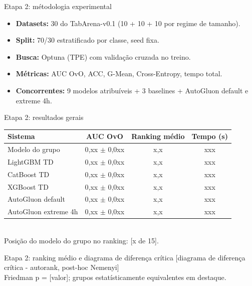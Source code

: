 \documentclass[aspectratio=169,11pt]{beamer}
\begin{document}
\begin{frame}{Etapa 2: métodologia experimental}
    \begin{itemize}
        \item \textbf{Datasets:} 30 do TabArena-v0.1 (10 + 10 + 10 por regime de tamanho).
        \item \textbf{Split:} 70/30 estratificado por classe, seed fixa.
        \item \textbf{Busca:} Optuna (TPE) com validação cruzada no treino.
        \item \textbf{Métricas:} AUC OvO, ACC, G-Mean, Cross-Entropy, tempo total.
        \item \textbf{Concorrentes:} 9 modelos atribuíveis + 3 baselines + AutoGluon default e extreme 4h.
    \end{itemize}
\end{frame}

\begin{frame}{Etapa 2: resultados gerais}
    \footnotesize
    \begin{tabular}{l c c c}
        \toprule
        \textbf{Sistema} & \textbf{AUC OvO} & \textbf{Ranking médio} & \textbf{Tempo (s)} \\
        \midrule
        Modelo do grupo      & 0,xx $\pm$ 0,0xx & x,x & xxx \\
        LightGBM TD          & 0,xx $\pm$ 0,0xx & x,x & xxx \\
        CatBoost TD          & 0,xx $\pm$ 0,0xx & x,x & xxx \\
        XGBoost TD           & 0,xx $\pm$ 0,0xx & x,x & xxx \\
        AutoGluon default    & 0,xx $\pm$ 0,0xx & x,x & xxx \\
        AutoGluon extreme 4h & 0,xx $\pm$ 0,0xx & x,x & xxx \\
        \bottomrule
    \end{tabular}
    \vspace{0.3em}
    \\
    \footnotesize Posição do modelo do grupo no ranking: [x de 15].
\end{frame}

\begin{frame}{Etapa 2: ranking médio e diagrama de diferença crítica}
    \centering
    [diagrama de diferença crítica - autorank, post-hoc Nemenyi]
    \\[0.4em]
    \footnotesize Friedman p = [valor]; grupos estatísticamente equivalentes em destaque.
\end{frame}
\end{document}
